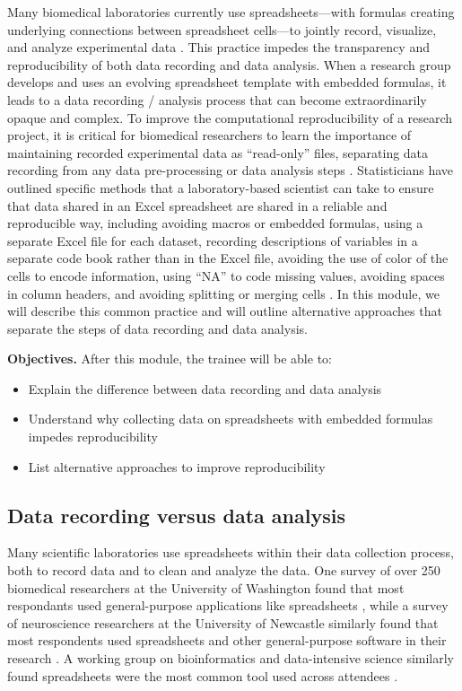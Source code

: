 \documentclass[]{tufte-book}
\providecommand{\tightlist}{%
  \setlength{\itemsep}{0pt}\setlength{\parskip}{0pt}}
\begin{document}
Many biomedical laboratories currently use spreadsheets---with formulas creating
underlying connections between spreadsheet cells---to jointly record, visualize,
and analyze experimental data \citep{broman2018data}. This practice impedes the
transparency and reproducibility of both data recording and data analysis. When
a research group develops and uses an evolving spreadsheet template with
embedded formulas, it leads to a data recording / analysis process that can
become extraordinarily opaque and complex. To improve the computational
reproducibility of a research project, it is critical for biomedical researchers
to learn the importance of maintaining recorded experimental data as ``read-only''
files, separating data recording from any data pre-processing or data analysis
steps \citep{broman2018data, marwick2018packaging}. Statisticians have outlined
specific methods that a laboratory-based scientist can take to ensure that data
shared in an Excel spreadsheet are shared in a reliable and reproducible way,
including avoiding macros or embedded formulas, using a separate Excel file for
each dataset, recording descriptions of variables in a separate code book rather
than in the Excel file, avoiding the use of color of the cells to encode
information, using ``NA'' to code missing values, avoiding spaces in column
headers, and avoiding splitting or merging cells \citep{ellis2018share, broman2018data}. In this module, we will describe this common practice and will
outline alternative approaches that separate the steps of data recording and
data analysis.

\textbf{Objectives.} After this module, the trainee will be able to:

\begin{itemize}
\tightlist
\item
  Explain the difference between data recording and data analysis
\item
  Understand why collecting data on spreadsheets with embedded formulas impedes
  reproducibility
\item
  List alternative approaches to improve reproducibility
\end{itemize}

\hypertarget{data-recording-versus-data-analysis}{%
\subsection{Data recording versus data analysis}\label{data-recording-versus-data-analysis}}

Many scientific laboratories use spreadsheets within their data collection
process, both to record data and to clean and analyze the data. One survey of
over 250 biomedical researchers at the University of Washington found that most
respondants used general-purpose applications like spreadsheets
\citep{anderson2007issues}, while a survey of neuroscience researchers at the
University of Newcastle similarly found that most respondents used spreadsheets
and other general-purpose software in their research \citep{altarawneh2017pilot}. A
working group on bioinformatics and data-intensive science similarly found
spreadsheets were the most common tool used across attendees
\citep{barga2011bioinformatics}.
\end{document}
